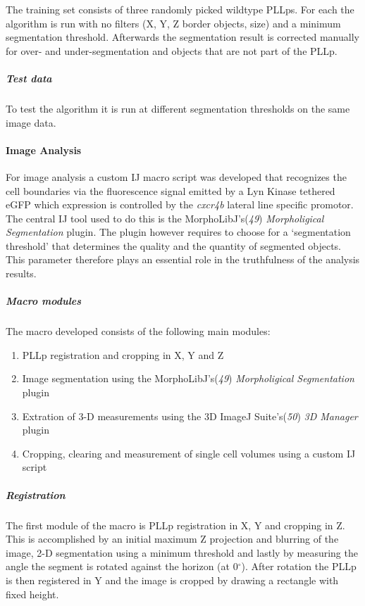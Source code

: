 \documentclass[11pt,singlespacinge,twoside]{reedthesis} %
\providecommand{\tightlist}{%
  \setlength{\itemsep}{0pt}\setlength{\parskip}{0pt}}
\begin{document}
The training set consists of three randomly picked wildtype PLLps. For each the algorithm is run with no filters (X, Y, Z border objects, size) and a minimum segmentation threshold. Afterwards the segmentation result is corrected manually for over- and under-segmentation and objects that are not part of the PLLp.

\hypertarget{test-data-1}{%
\subparagraph{Test data}\label{test-data-1}}

To test the algorithm it is run at different segmentation thresholds on the same image data.

\newpage

\hypertarget{image-analysis-1}{%
\paragraph{Image Analysis}\label{image-analysis-1}}

For image analysis a custom IJ macro script was developed that recognizes the cell boundaries via the fluorescence signal emitted by a Lyn Kinase tethered eGFP which expression is controlled by the \emph{cxcr4b} lateral line specific promotor. The central IJ tool used to do this is the MorphoLibJ's(\emph{49}) \emph{Morpholigical Segmentation} plugin. The plugin however requires to choose for a `segmentation threshold' that determines the quality and the quantity of segmented objects. This parameter therefore plays an essential role in the truthfulness of the analysis results.

\hypertarget{macro-modules-1}{%
\subparagraph{Macro modules}\label{macro-modules-1}}

The macro developed consists of the following main modules:
\begin{enumerate}
\def\labelenumi{\arabic{enumi}.}
\tightlist
\item
  PLLp registration and cropping in X, Y and Z
\item
  Image segmentation using the MorphoLibJ's(\emph{49}) \emph{Morpholigical Segmentation} plugin
\item
  Extration of 3-D measurements using the 3D ImageJ Suite's(\emph{50}) \emph{3D Manager} plugin
\item
  Cropping, clearing and measurement of single cell volumes using a custom IJ script
\end{enumerate}
\hypertarget{registration}{%
\subparagraph{Registration}\label{registration}}

The first module of the macro is PLLp registration in X, Y and cropping in Z. This is accomplished by an initial maximum Z projection and blurring of the image, 2-D segmentation using a minimum threshold and lastly by measuring the angle the segment is rotated against the horizon (at 0\(^{\circ}\)). After rotation the PLLp is then registered in Y and the image is cropped by drawing a rectangle with fixed height.
\end{document}
